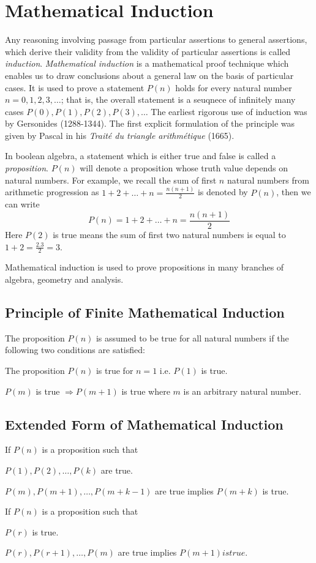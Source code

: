 \chapter{Mathematical Induction}
Any reasoning involving passage from particular assertions to general assertions, which derive their validity from the validity of
particular assertions is called {\it induction}. {\it Mathematical induction} is a mathematical proof technique which enables us to
draw conclusions about a general law on the basis of particular cases. It is used to prove a statement $P(n)$ holds for every
natural number $n = 0, 1, 2, 3, \ldots$; that is, the overall statement is a seuqnece of infinitely many cases $P(0), P(1), P(2),
P(3), \ldots$ The earliest rigorous use of induction was by Gersonides (1288-1344). The first explicit formulation of the principle
was given by Pascal in his {\it Trait\'e du triangle arithm\'etique} (1665).

In boolean algebra, a statement which is either true and false is called a {\it proposition}. $P(n)$ will denote a proposition
whose truth value depends on natural numbers. For example, we recall the sum of first $n$ natural numbers from arithmetic
progression as $1 + 2 + \ldots + n = \frac{n(n + 1)}{2}$ is denoted by $P(n)$, then we can write
$$P(n) = 1 + 2 + \ldots + n = \frac{n(n + 1)}{2}$$
Here $P(2)$ is true means the sum of first two natural numbers is equal to $1 + 2 = \frac{2.3}{2} = 3$.

Mathematical induction is used to prove propositions in many branches of algebra, geometry and analysis.

\section{Principle of Finite Mathematical Induction}
The proposition $P(n)$ is assumed to be true for all natural numbers if the following two conditions are satisfied:
\startitemize[n]
\item The proposition $P(n)$ is true for $n = 1$ i.e. $P(1)$ is true.
\item $P(m)$ is true $\Rightarrow P(m + 1)$ is true where $m$ is an arbitrary natural number.
\stopitemize

\section{Extended Form of Mathematical Induction}
\startitemize[n]
\item If $P(n)$ is a proposition such that
  \startitemize[n]
  \item $P(1), P(2), \ldots, P(k)$ are true.
  \item $P(m), P(m + 1), \ldots, P(m + k - 1)$ are true implies $P(m + k)$ is true.
  \stopitemize
\item If $P(n)$ is a proposition such that
  \startitemize[n]
  \item $P(r)$ is true.
  \item $P(r), P(r + 1), \ldots, P(m)$ are true implies $P(m + 1) is true.$
  \stopitemize
\stopitemize

